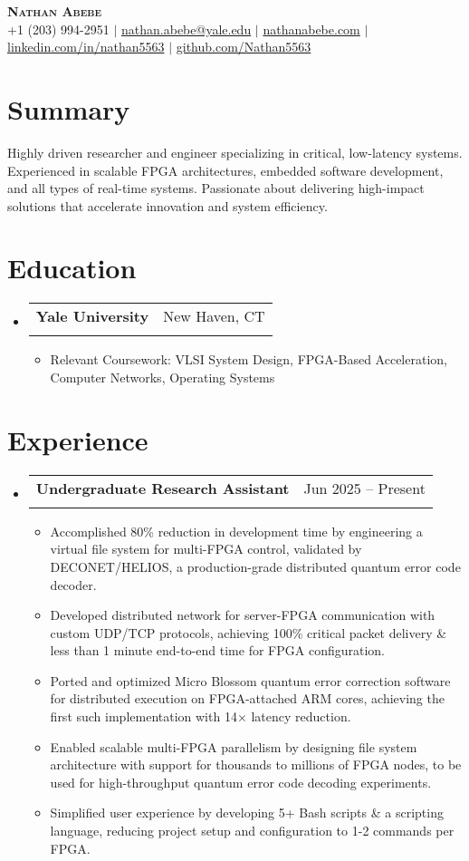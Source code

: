 \documentclass[letterpaper,11pt]{article}
\makeatletter
\newcommand{\resumeItem}[1]{
  \item\small{
    {#1 \vspace{-2pt}}
  }
}
\newcommand{\resumeSummary}[1]{
    #1
}
\newcommand{\resumeSubheading}[4]{
  \vspace{-2pt}\item
    \begin{tabular*}{0.97\textwidth}[t]{l@{\extracolsep{\fill}}r}
      \textbf{#1} & #2 \\
      \text{\small#3} & \text{\small #4} \\
    \end{tabular*}\vspace{-7pt}
}
\newcommand{\resumeSubHeadingListStart}{\begin{itemize}[leftmargin=0.15in, label={}]}
\newcommand{\resumeSubHeadingListEnd}{\end{itemize}}
\newcommand{\resumeItemListStart}{\begin{itemize}}
\newcommand{\resumeItemListEnd}{\end{itemize}\vspace{-5pt}}
\makeatother
\begin{document}
\begin{center}
    \textbf{\Huge \scshape Nathan Abebe} \\ \vspace{5pt}
    \small +1 (203) 994-2951 $|$ \href{mailto:nathan.abebe@yale.edu}{nathan.abebe@yale.edu} $|$ \href{https://nathanabebe.com}{nathanabebe.com} $|$ 
    \href{https://linkedin.com/in/nathan5563}{linkedin.com/in/nathan5563} $|$
    \href{https://github.com/Nathan5563}{github.com/Nathan5563}
\end{center}

\section{Summary}
    \resumeSummary{Highly driven researcher and engineer specializing in critical, low-latency systems. Experienced in scalable FPGA architectures, embedded software development, and all types of real-time systems. Passionate about delivering high-impact solutions that accelerate innovation and system efficiency.}

\section{Education}
  \resumeSubHeadingListStart
    \resumeSubheading
      {Yale University}{New Haven, CT}
      {B.S. Computer Science, B.S. Electrical Engineering (ABET)}{May 2028}
      \resumeItemListStart
        \resumeItem{Relevant Coursework: VLSI System Design, FPGA-Based Acceleration, Computer Networks, Operating Systems }
      \resumeItemListEnd
  \resumeSubHeadingListEnd


\section{Experience}
  \resumeSubHeadingListStart
    \resumeSubheading
      {Undergraduate Research Assistant}{Jun 2025 -- Present}
      {Yale University, Advisor: Professor Lin Zhong, Ph.D.}{New Haven, CT}
      \resumeItemListStart
        \resumeItem{Accomplished 80\% reduction in development time by engineering a virtual file system for multi-FPGA control, validated by DECONET/HELIOS, a production-grade distributed quantum error code decoder.}
        \resumeItem{Developed distributed network for server-FPGA communication with custom UDP/TCP protocols, achieving 100\% critical packet delivery \& less than 1 minute end-to-end time for FPGA configuration.}
        \resumeItem{Ported and optimized Micro Blossom quantum error correction software for distributed execution on FPGA-attached ARM cores, achieving the first such implementation with 14× latency reduction.}
        \resumeItem{Enabled scalable multi-FPGA parallelism by designing file system architecture with support for thousands to millions of FPGA nodes, to be used for high-throughput quantum error code decoding experiments.}
        \resumeItem{Simplified user experience by developing 5+ Bash scripts \& a scripting language, reducing project setup and configuration to 1-2 commands per FPGA.}
      \resumeItemListEnd
  \resumeSubHeadingListEnd
\end{document}
